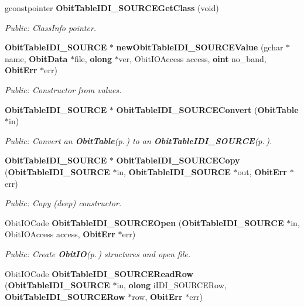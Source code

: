 \begin{CompactItemize}
gconstpointer {\bf Obit\-Table\-IDI\_\-SOURCEGet\-Class} (void)
\begin{CompactList}\small\item\em Public: Class\-Info pointer. \item\end{CompactList}\item 
{\bf Obit\-Table\-IDI\_\-SOURCE} $\ast$ {\bf new\-Obit\-Table\-IDI\_\-SOURCEValue} (gchar $\ast$name, {\bf Obit\-Data} $\ast$file, {\bf olong} $\ast$ver, Obit\-IOAccess access, {\bf oint} no\_\-band, {\bf Obit\-Err} $\ast$err)
\begin{CompactList}\small\item\em Public: Constructor from values. \item\end{CompactList}\item 
{\bf Obit\-Table\-IDI\_\-SOURCE} $\ast$ {\bf Obit\-Table\-IDI\_\-SOURCEConvert} ({\bf Obit\-Table} $\ast$in)
\begin{CompactList}\small\item\em Public: Convert an {\bf Obit\-Table}{\rm (p.\,\pageref{structObitTable})} to an {\bf Obit\-Table\-IDI\_\-SOURCE}{\rm (p.\,\pageref{structObitTableIDI__SOURCE})}. \item\end{CompactList}\item 
{\bf Obit\-Table\-IDI\_\-SOURCE} $\ast$ {\bf Obit\-Table\-IDI\_\-SOURCECopy} ({\bf Obit\-Table\-IDI\_\-SOURCE} $\ast$in, {\bf Obit\-Table\-IDI\_\-SOURCE} $\ast$out, {\bf Obit\-Err} $\ast$err)
\begin{CompactList}\small\item\em Public: Copy (deep) constructor. \item\end{CompactList}\item 
Obit\-IOCode {\bf Obit\-Table\-IDI\_\-SOURCEOpen} ({\bf Obit\-Table\-IDI\_\-SOURCE} $\ast$in, Obit\-IOAccess access, {\bf Obit\-Err} $\ast$err)
\begin{CompactList}\small\item\em Public: Create {\bf Obit\-IO}{\rm (p.\,\pageref{structObitIO})} structures and open file. \item\end{CompactList}\item 
Obit\-IOCode {\bf Obit\-Table\-IDI\_\-SOURCERead\-Row} ({\bf Obit\-Table\-IDI\_\-SOURCE} $\ast$in, {\bf olong} i\-IDI\_\-SOURCERow, {\bf Obit\-Table\-IDI\_\-SOURCERow} $\ast$row, {\bf Obit\-Err} $\ast$err)

\end{CompactItemize}
